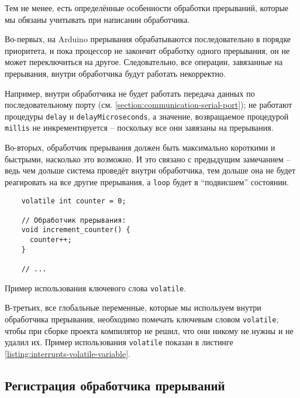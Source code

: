 \documentclass[../sparc.tex]{subfiles}
\begin{document}
Тем не менее, есть определённые особенности обработки прерываний, которые мы
обязаны учитывать при написании обработчика.

Во-первых, на Arduino прерывания обрабатываются последовательно в порядке
приоритета, и пока процессор не закончит обработку одного прерывания, он не
может переключиться на другое.  Следовательно, все операции, завязанные на
прерывания, внутри обработчика будут работать некорректно.

Например, внутри обработчика не будет работать передача данных по
последовательному порту (см. \ref{section:communication-serial-port}); не
работают процедуры \texttt{delay} и \texttt{delayMicroseconds}, а значение,
возвращаемое процедурой \texttt{millis} не инкрементируется -- поскольку все они
завязаны на прерывания.

Во-вторых, обработчик прерывания должен быть максимально короткими и быстрыми,
насколько это возможно.  И это связано с предыдущим замечанием -- ведь чем дольше
система проведёт внутри обработчика, тем дольше она не будет реагировать на все
другие прерывания, а \texttt{loop} будет в ``подвисшем'' состоянии.

\begin{listing}[H]
  \begin{verbatim}
    volatile int counter = 0;

    // Обработчик прерывания:
    void increment_counter() {
      counter++;
    }

    // ...
  \end{verbatim}
  \caption{Пример использования ключевого слова \texttt{volatile}.}
  \label{listing:interrupts-volatile-variable}
\end{listing}

В-третьих, все глобальные переменные, которые мы используем внутри обработчика
прерывания, необходимо помечать ключевым словом \texttt{volatile}, чтобы при
сборке проекта компилятор не решил, что они никому не нужны и не удалил их.
Пример использования \texttt{volatile} показан в листинге
\ref{listing:interrupts-volatile-variable}.

\subsection{Регистрация обработчика прерываний}
\end{document}

